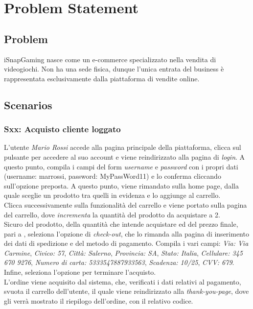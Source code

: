 \documentclass[12pt, a4paper, oneside]{book}
\begin{document}
    \setcounter{tocdepth}{3} %

    \tableofcontents

    \chapter*{Problem Statement}
    \section*{Problem}
    iSnapGaming nasce come un e-commerce specializzato nella vendita di videogiochi. Non ha una sede fisica, dunque l'unica entrata del business è rappresentata esclusivamente dalla piattaforma di vendite online.

    \section*{Scenarios}
    \subsection*{Sxx: Acquisto cliente loggato}
    L'utente \textit{Mario Rossi} accede alla pagina principale della piattaforma, clicca sul pulsante per accedere al suo account e viene reindirizzato alla pagina di \textit{login}. A questo punto, compila i campi del form \textit{username} e \textit{password} con i propri dati (username: marrossi, password: MyPassWord11) e lo conferma cliccando sull'opzione preposta. A questo punto, viene rimandato sulla home page, dalla quale sceglie un prodotto tra quelli in evidenza e lo aggiunge al carrello.\\
    Clicca successivamente sulla funzionalità del carrello e viene portato sulla pagina del carrello, dove \textit{incrementa} la quantità del prodotto da acquistare a 2.\\
    Sicuro del prodotto, della quantità che intende acquistare ed del prezzo finale, pari a , seleziona l'opzione di \textit{check-out}, che lo rimanda alla pagina di inserimento dei dati di spedizione e del metodo di pagamento. Compila i vari campi: \textit{Via: Via Carmine}, \textit{Civico: 57}, \textit{Città: Salerno}, \textit{Provincia: SA}, \textit{Stato: Italia}, \textit{Cellulare: 345 670 9276}, \textit{Numero di carta: 5333547887933563}, \textit{Scadenza: 10/25}, \textit{CVV: 679}. Infine, seleziona l'opzione per terminare l'acquisto.\\
    L'ordine viene acquisito dal sistema, che, verificati i dati relativi al pagamento, svuota il carrello dell'utente, il quale viene reindirizzato alla \textit{thank-you-page}, dove gli verrà mostrato il riepilogo dell'ordine, con il relativo codice.
\end{document}
